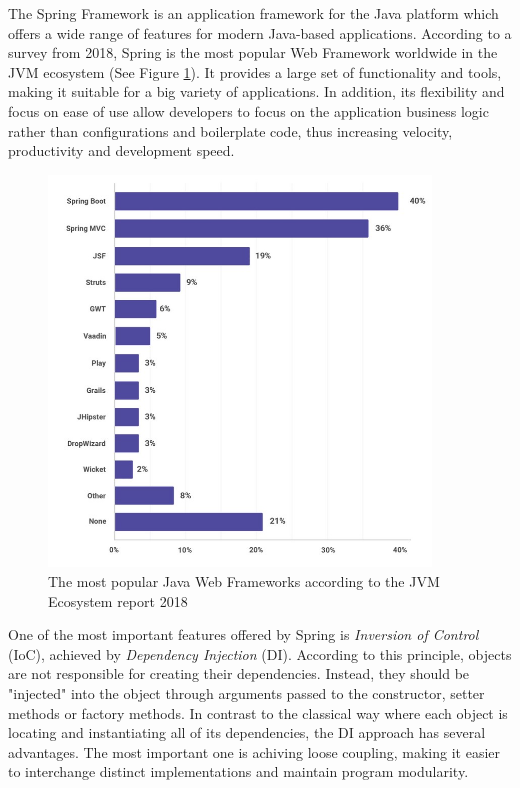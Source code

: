 The Spring Framework is an application framework for the Java platform which offers a wide range of features for modern Java-based applications. According to a survey from 2018, Spring is the most popular Web Framework worldwide in the JVM ecosystem (See Figure \ref{javaWebFrameworksTrendsImg}). It provides a large set of functionality and tools, making it suitable for a big variety of applications. In addition, its flexibility and focus on ease of use allow developers to focus on the application business logic rather than configurations and boilerplate code, thus increasing velocity, productivity and development speed.

\begin{figure}[H]
    \centering
    \includegraphics[width=4in]{images/javaWebFrameworksTrends}
    \caption{The most popular Java Web Frameworks according to the JVM Ecosystem report 2018 \cite{jvmEcosystemReport}}
    \label{javaWebFrameworksTrendsImg}
\end{figure}

One of the most important features offered by Spring is \textit{Inversion of Control} (IoC), achieved by \textit{Dependency Injection} (DI). According to this principle, objects are not responsible for creating their dependencies. Instead, they should be "injected" into the object through arguments passed to the constructor, setter methods or factory methods. In contrast to the classical way where each object is locating and instantiating all of its dependencies, the DI approach has several advantages. The most important one is achiving loose coupling, making it easier to interchange distinct implementations and maintain program modularity.

